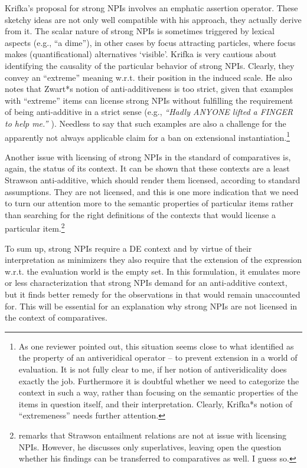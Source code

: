 \documentclass[output=paper,colorlinks,citecolor=brown,
]{langscibook}
\begin{document}
Krifka's \citeyearpar{krifka1995} proposal for strong NPIs involves an emphatic assertion operator. These sketchy ideas are not
only well compatible with his approach, they actually derive from it. The scalar nature of strong NPIs is sometimes
triggered by lexical aspects (e.g., ``a dime''), in other cases by focus attracting particles, where focus makes
(quantificational) alternatives `visible'. Krifka is very cautious about identifying the causality of the particular
behavior of strong NPIs. Clearly, they convey an ``extreme'' meaning w.r.t. their position in the induced scale. He also
notes that Zwart*s \citeyear{zwarts1990} notion of anti-additiveness is too strict, given that examples with ``extreme'' items
can license strong NPIs without fulfilling the requirement of being anti-additive in a strict sense (e.g., \textit{``Hadly ANYONE
lifted a FINGER to help me.'' \citet{krifka1995}}). Needless to say that such examples are also a challenge for the apparently not always applicable claim for a ban on
extensional instantiation.\footnote{As one reviewer pointed out, this situation seems close to what \citet{giannak2007} identified
as the property of an antiveridical operator -- to prevent extension in a world of evaluation. It is not fully
clear to me, if her notion of antiveridicality does exactly the job. Furthermore it is doubtful whether we need to categorize the context in such a way, rather than
focusing on the semantic properties of the items in question itself, and their interpretation. Clearly, Krifka*s notion of
``extremeness'' needs further attention.}

Another issue with licensing of strong NPIs in the standard of comparatives is, again, the
status of its context. It can be shown that these contexts are a least Strawson anti-additive, which should render them licensed, according
to standard assumptions. They are not licensed, and this is
one more indication that we need to turn our attention more to the semantic properties of particular items rather than
searching for the right definitions of the contexts that would license a particular item.\footnote{\citet{gajewski2010} remarks
that Strawson entailment relations are not at issue with licensing NPIs. However, he discusses only superlatives, leaving open the
question whether his findings can be transferred to comparatives as well. I guess so.}

To sum up, strong NPIs require a DE context and by virtue of their interpretation as minimizers they also require that
the extension of the expression w.r.t. the evaluation world is the empty set. In this formulation, it emulates
more or less \citet{zwarts1998} characterization that strong NPIs demand for an anti-additive context, but it finds better remedy
for the observations in \citet{heim1984} that would remain unaccounted for. This will be essential for an explanation
why strong NPIs are not licensed in the context of comparatives.
\end{document}
